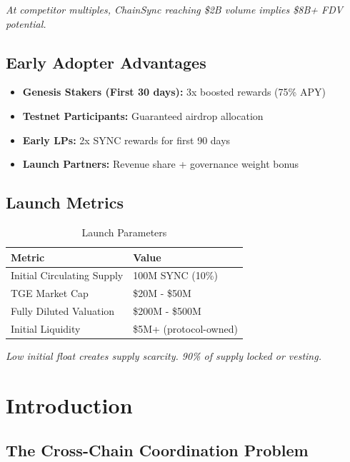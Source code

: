 \documentclass[12pt,a4paper]{article}
\begin{document}
\textit{At competitor multiples, ChainSync reaching \$2B volume implies \$8B+ FDV potential.}

\subsection{Early Adopter Advantages}

\begin{itemize}
    \item \textbf{Genesis Stakers (First 30 days):} 3x boosted rewards (75\% APY)
    \item \textbf{Testnet Participants:} Guaranteed airdrop allocation
    \item \textbf{Early LPs:} 2x SYNC rewards for first 90 days
    \item \textbf{Launch Partners:} Revenue share + governance weight bonus
\end{itemize}

\subsection{Launch Metrics}

\begin{table}[h]
\centering
\begin{tabular}{ll}
\toprule
\textbf{Metric} & \textbf{Value} \\
\midrule
Initial Circulating Supply & 100M SYNC (10\%) \\
TGE Market Cap & \$20M - \$50M \\
Fully Diluted Valuation & \$200M - \$500M \\
Initial Liquidity & \$5M+ (protocol-owned) \\
\bottomrule
\end{tabular}
\caption{Launch Parameters}
\end{table}

\textit{Low initial float creates supply scarcity. 90\% of supply locked or vesting.}

\section{Introduction}

\subsection{The Cross-Chain Coordination Problem}
\end{document}
